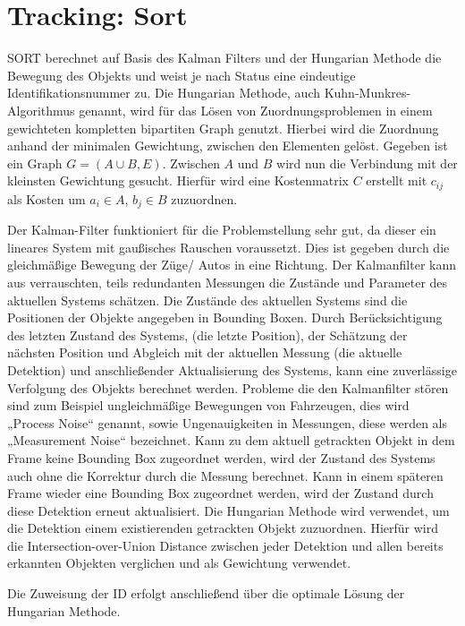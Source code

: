 \documentclass[conference]{IEEEtran}
\begin{document}
	\section{Tracking: Sort}
	SORT berechnet auf Basis des Kalman Filters und der Hungarian Methode die Bewegung des Objekts und weist je nach Status eine eindeutige Identifikationsnummer zu. Die Hungarian Methode, auch Kuhn-Munkres-Algorithmus genannt, wird für das Lösen von Zuordnungsproblemen in einem gewichteten kompletten bipartiten Graph genutzt. Hierbei wird die Zuordnung anhand der minimalen Gewichtung, zwischen den Elementen gelöst. Gegeben ist ein Graph $G = (A \cup B, E) $. Zwischen $A$ und $B$ wird nun die Verbindung mit der kleinsten Gewichtung gesucht. Hierfür wird eine Kostenmatrix $C$ erstellt mit $c_{ij}$ als Kosten um $a_i \in A$, $b_j \in B$ zuzuordnen. 
	
	Der Kalman-Filter funktioniert für die Problemstellung sehr gut, da dieser ein lineares System mit gaußisches Rauschen voraussetzt. Dies ist gegeben durch die gleichmäßige Bewegung der Züge/ Autos in eine Richtung.
	Der Kalmanfilter kann aus verrauschten, teils redundanten Messungen die Zustände und Parameter des aktuellen Systems schätzen. 
	Die Zustände des aktuellen Systems sind die Positionen der Objekte angegeben in Bounding Boxen. Durch Berücksichtigung des letzten Zustand des Systems, (die letzte Position), der Schätzung der nächsten Position und Abgleich mit der aktuellen Messung (die aktuelle Detektion) und anschließender Aktualisierung des Systems, kann eine zuverlässige Verfolgung des Objekts berechnet werden. Probleme die den Kalmanfilter stören sind zum Beispiel ungleichmäßige Bewegungen von Fahrzeugen, dies wird „Process Noise“ genannt, sowie Ungenauigkeiten in Messungen, diese werden als „Measurement Noise“ bezeichnet.
	Kann zu dem aktuell getrackten Objekt in dem Frame keine Bounding Box zugeordnet werden, wird der Zustand des Systems auch ohne die Korrektur durch die Messung berechnet. Kann in einem späteren Frame wieder eine Bounding Box zugeordnet werden, wird der Zustand durch diese Detektion erneut aktualisiert. 
	Die Hungarian Methode wird verwendet, um die Detektion einem existierenden getrackten Objekt zuzuordnen. Hierfür wird die Intersection-over-Union Distance zwischen jeder Detektion und allen bereits erkannten Objekten verglichen und als Gewichtung verwendet.
	

	
	Die Zuweisung der ID erfolgt anschließend über die optimale Lösung der Hungarian Methode.
	
\end{document}
